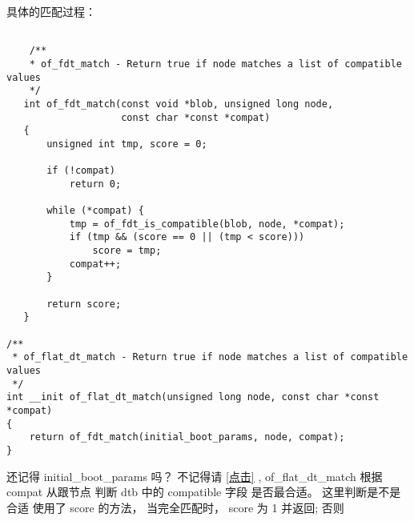 具体的匹配过程：

\begin{lstlisting}

    /**
    * of_fdt_match - Return true if node matches a list of compatible values
    */
   int of_fdt_match(const void *blob, unsigned long node,
                    const char *const *compat)
   {
       unsigned int tmp, score = 0;
   
       if (!compat)
           return 0;
   
       while (*compat) {
           tmp = of_fdt_is_compatible(blob, node, *compat);
           if (tmp && (score == 0 || (tmp < score)))
               score = tmp;
           compat++;
       }
   
       return score;
   }

/**
 * of_flat_dt_match - Return true if node matches a list of compatible values
 */
int __init of_flat_dt_match(unsigned long node, const char *const *compat)
{
	return of_fdt_match(initial_boot_params, node, compat);
}
\end{lstlisting}

还记得 initial\_boot\_params 吗？ 不记得请 \ref{点击}  , of\_flat\_dt\_match 根据 compat 从跟节点 
判断 dtb 中的 compatible 字段 是否最合适。 这里判断是不是合适 使用了 score 的方法， 当完全匹配时，
score 为 1  并返回; 否则

